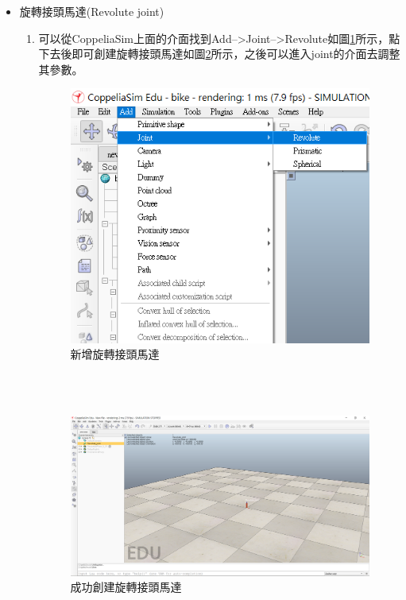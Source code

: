 \documentclass[14pt,a4paper]{report}  %
\begin{document}
{{{\begin{itemize}
\begin{enumerate}
      	\end{enumerate}
      \end{itemize}
      
      \begin{itemize}
      \item 旋轉接頭馬達(Revolute joint)
      	\begin{enumerate}
      	\item{可以從CoppeliaSim上面的介面找到Add-->Joint-->Revolute如圖\ref{fig_add_revolute_joint:scale}所示，點下去後即可創建旋轉接頭馬達如圖\ref{fig_Revolute_joint:scale}所示，之後可以進入joint的介面去調整其參數。}
      		
      \begin{figure}[hbt!]
        \centering
        \includegraphics[scale=0.75]{add_revolute_joint.png}
        \caption{新增旋轉接頭馬達}
        \label{fig_add_revolute_joint:scale}
      \end{figure}
      \hspace*{\fill} \\
      \hspace*{\fill} \\
      
      \begin{figure}[hbt!]
        \centering
        \includegraphics[scale=0.4]{Revolute_joint.png}
        \caption{成功創建旋轉接頭馬達}
        \label{fig_Revolute_joint:scale}
      \end{figure}
      

\end{enumerate}
\end{itemize}}}}
\end{document}
